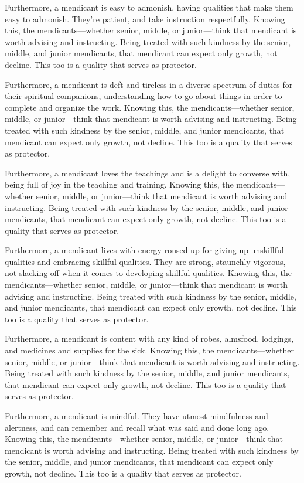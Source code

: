 \documentclass[12pt,openany]{book}%
\begin{document}
Furthermore, a mendicant is easy to admonish, having qualities that make them easy to admonish. They’re patient, and take instruction respectfully. Knowing this, the mendicants—whether senior, middle, or junior—think that mendicant is worth advising and instructing. Being treated with such kindness by the senior, middle, and junior mendicants, that mendicant can expect only growth, not decline. This too is a quality that serves as protector. 

Furthermore, a mendicant is deft and tireless in a diverse spectrum of duties for their spiritual companions, understanding how to go about things in order to complete and organize the work. Knowing this, the mendicants—whether senior, middle, or junior—think that mendicant is worth advising and instructing. Being treated with such kindness by the senior, middle, and junior mendicants, that mendicant can expect only growth, not decline. This too is a quality that serves as protector. 

Furthermore, a mendicant loves the teachings and is a delight to converse with, being full of joy in the teaching and training. Knowing this, the mendicants—whether senior, middle, or junior—think that mendicant is worth advising and instructing. Being treated with such kindness by the senior, middle, and junior mendicants, that mendicant can expect only growth, not decline. This too is a quality that serves as protector. 

Furthermore, a mendicant lives with energy roused up for giving up unskillful qualities and embracing skillful qualities. They are strong, staunchly vigorous, not slacking off when it comes to developing skillful qualities. Knowing this, the mendicants—whether senior, middle, or junior—think that mendicant is worth advising and instructing. Being treated with such kindness by the senior, middle, and junior mendicants, that mendicant can expect only growth, not decline. This too is a quality that serves as protector. 

Furthermore, a mendicant is content with any kind of robes, almsfood, lodgings, and medicines and supplies for the sick. Knowing this, the mendicants—whether senior, middle, or junior—think that mendicant is worth advising and instructing. Being treated with such kindness by the senior, middle, and junior mendicants, that mendicant can expect only growth, not decline. This too is a quality that serves as protector. 

Furthermore, a mendicant is mindful. They have utmost mindfulness and alertness, and can remember and recall what was said and done long ago. Knowing this, the mendicants—whether senior, middle, or junior—think that mendicant is worth advising and instructing. Being treated with such kindness by the senior, middle, and junior mendicants, that mendicant can expect only growth, not decline. This too is a quality that serves as protector. 
\end{document}
